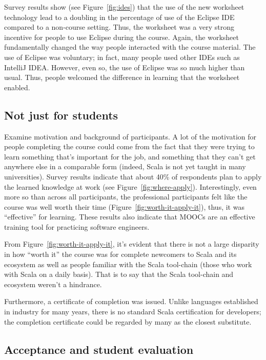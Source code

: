 \documentclass{sig-alternate}
\begin{document}
Survey results show (see Figure~\ref{fig:ides}) that the use
of the new worksheet technology lead to a doubling in the percentage of use of
the Eclipse IDE compared to a non-course setting. Thus, the worksheet was a
very strong incentive for people to use Eclipse during the course. Again, the
worksheet fundamentally changed the way people interacted with the course
material. The use of Eclipse was voluntary; in fact, many people used other
IDEs such as IntelliJ IDEA. However, even so, the use of Eclipse was so much
higher than usual. Thus, people welcomed the difference in learning that the
worksheet enabled.


\subsection{Not just for students}

Examine motivation and background of participants. A lot of the motivation for
people completing the course could come from the fact that they were trying to
learn something that's important for the job, and something that they can't
get anywhere else in a comparable form (indeed, Scala is not yet taught in
many universities). Survey results indicate that about 40\% of respondents
plan to apply the learned knowledge at work (see Figure~\ref{fig:where-apply}).
Interestingly, even more so than across all participants, the professional
participants felt like the course was well worth their time
(Figure~\ref{fig:worth-it-apply-it}), thus, it was ``effective'' for learning.
These results also indicate that MOOCs are an effective training tool for practicing
software engineers.

From Figure~\ref{fig:worth-it-apply-it}, it's evident that there is not a large disparity in how ``worth it'' the course was for complete newcomers to Scala and its ecosystem as well as people familiar with the Scala tool-chain (those who work with Scala on a daily basis). That is to say that the Scala tool-chain and ecosystem weren't a hindrance.

Furthermore, a certificate of completion was issued. Unlike languages
established in industry for many years, there is no standard Scala
certification for developers; the completion certificate could be regarded by
many as the closest substitute.


\subsection{Acceptance and student evaluation}
\end{document}
